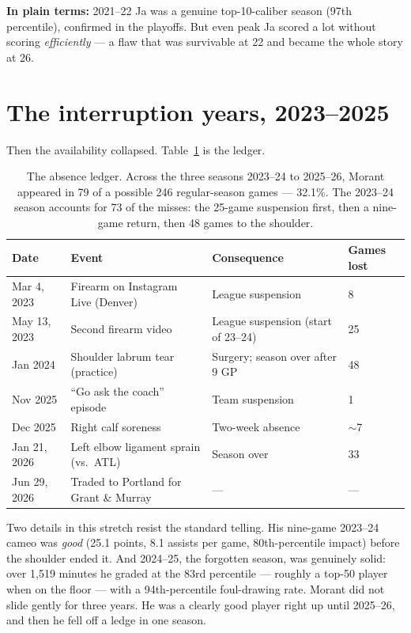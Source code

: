 \documentclass[11pt]{article}
\newcommand{\plainbox}[1]{\par\medskip\noindent\begin{center}%
\colorbox{court!8}{\parbox{0.93\textwidth}{\small \textbf{\textcolor{court}{In plain terms:}} #1}}%
\end{center}\medskip}
\begin{document}
\plainbox{2021--22 Ja was a genuine top-10-caliber season (97th percentile), confirmed in
the playoffs. But even peak Ja scored a lot without scoring \emph{efficiently} --- a flaw
that was survivable at 22 and became the whole story at 26.}

\section{The interruption years, 2023--2025}
\label{sec:interruption}

Then the availability collapsed. Table~\ref{tab:timeline} is the ledger.

\begin{table}[h]
\centering\small
\caption{The absence ledger. Across the three seasons 2023--24 to 2025--26, Morant
appeared in 79 of a possible 246 regular-season games --- 32.1\%. The 2023--24 season
accounts for 73 of the misses: the 25-game suspension first, then a nine-game return,
then 48 games to the shoulder.}
\begin{tabular}{llll}
\toprule
Date & Event & Consequence & Games lost \\
\midrule
Mar 4, 2023 & Firearm on Instagram Live (Denver) & League suspension & 8 \\
May 13, 2023 & Second firearm video & League suspension (start of 23--24) & 25 \\
Jan 2024 & Shoulder labrum tear (practice) & Surgery; season over after 9 GP & 48 \\
Nov 2025 & ``Go ask the coach'' episode & Team suspension & 1 \\
Dec 2025 & Right calf soreness & Two-week absence & $\sim$7 \\
Jan 21, 2026 & Left elbow ligament sprain (vs.\ ATL) & Season over & 33 \\
Jun 29, 2026 & Traded to Portland for Grant \& Murray & --- & --- \\
\bottomrule
\end{tabular}
\label{tab:timeline}
\end{table}

Two details in this stretch resist the standard telling. His nine-game 2023--24 cameo was
\emph{good} (25.1 points, 8.1 assists per game, 80th-percentile impact) before the
shoulder ended it. And 2024--25, the forgotten season, was genuinely solid: over 1{,}519
minutes he graded at the 83rd percentile --- roughly a top-50 player when on the floor
--- with a 94th-percentile foul-drawing rate. Morant did not slide gently for three
years. He was a clearly good player right up until 2025--26, and then he fell off a
ledge in one season.
\end{document}
